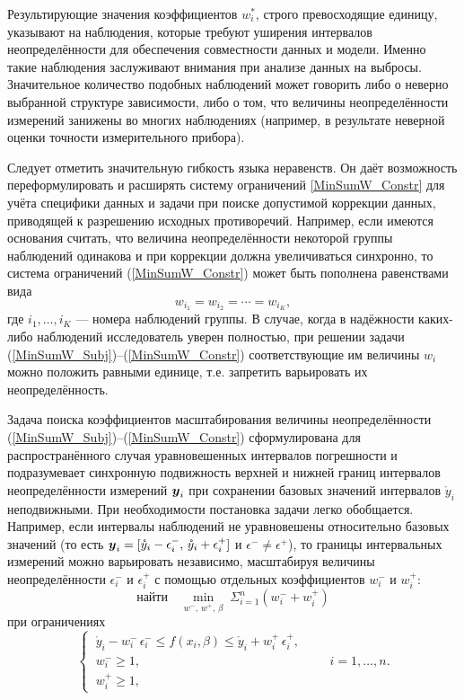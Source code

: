 \documentclass[a5paper,openany]{book}
\newcommand{\mbf}[1]{\protect\text{\boldmath$#1$}}
\begin{document}
Результирующие значения коэффициентов $w_i^*$, строго превосходящие единицу, указывают 
на наблюдения, которые требуют уширения интервалов неопределённости для обеспечения 
совместности данных и модели. Именно такие наблюдения заслуживают внимания при анализе 
данных на выбросы. Значительное количество подобных наблюдений может говорить либо 
о неверно выбранной структуре зависимости, либо о том, что величины неопределённости 
измерений занижены во многих наблюдениях (например, в результате неверной оценки 
точности измерительного прибора). 
  
Следует отметить значительную гибкость языка неравенств. Он даёт возможность 
переформулировать и расширять систему ограничений \eqref{MinSumW_Constr} для учёта 
специфики данных и задачи при поиске допустимой коррекции данных, приводящей 
к разрешению исходных противоречий. Например, если имеются основания считать, 
что величина неопределённости некоторой группы наблюдений одинакова и при коррекции 
должна увеличиваться синхронно, то система ограничений (\ref{MinSumW_Constr}) может 
быть пополнена равенствами вида 
\begin{equation*} 
w_{i_1} = w_{i_2} = \cdots = w_{i_K}, 
\end{equation*} 
где $i_1, \dots, i_K$ --- номера наблюдений группы.
В случае, когда в надёжности каких-либо наблюдений исследователь уверен полностью, 
при решении задачи (\ref{MinSumW_Subj})--(\ref{MinSumW_Constr}) соответствующие 
им величины $w_i$ можно положить равными единице, т.е. запретить варьировать их 
неопределённость. 

Задача поиска коэффициентов масштабирования величины неопределённости 
(\ref{MinSumW_Subj})--(\ref{MinSumW_Constr}) сформулирована для 
распространённого случая уравновешенных интервалов погрешности и подразумевает 
синхронную подвижность верхней и нижней границ интервалов неопределённости 
измерений $\mbf y_i$ при сохранении базовых значений интервалов $\mathring{y}_i$ 
неподвижными. При необходимости постановка задачи легко обобщается. Например, если 
интервалы наблюдений не уравновешены относительно базовых значений 
(то есть $\mbf y_i = [\mathring{y}_i - \epsilon^{-}_i,\, \mathring{y}_i + 
\epsilon^{+}_i ]$ и $\epsilon^{-} \neq \epsilon^{+}$), 
то границы интервальных измерений можно варьировать независимо, масштабируя 
величины неопределённости $\epsilon^{-}_i$ и $\epsilon^{+}_i$ с помощью отдельных 
коэффициентов $w_i^{-}$  и $w_i^{+}$: 
\begin{equation} 
\label{MinSumW_Subj_Nonsym} 
\text{найти} \quad \min_{w^{-},\,w^{+},\,\beta}\;\Sigma_{i=1}^n (w_i^{-} + w_i^{+}) 
\end{equation}
при ограничениях
\begin{equation} 
\label{MinSumW_Constr_Nonsym} 
\left\{ \ 
\begin{gathered}
\mathring{y}_i - w_i^{-} \, \epsilon^{-}_i \leq f(x_i,\beta) \leq 
\mathring{y}_i + w_i^{+} \, \epsilon^{+}_i, \\[2pt] 
w_i^{-} \geq 1, \\[2pt]  
w_i^{+} \geq 1, 
\end{gathered}
\qquad i = 1,\dots,n. 
\right. 
\end{equation}
  
\end{document}
